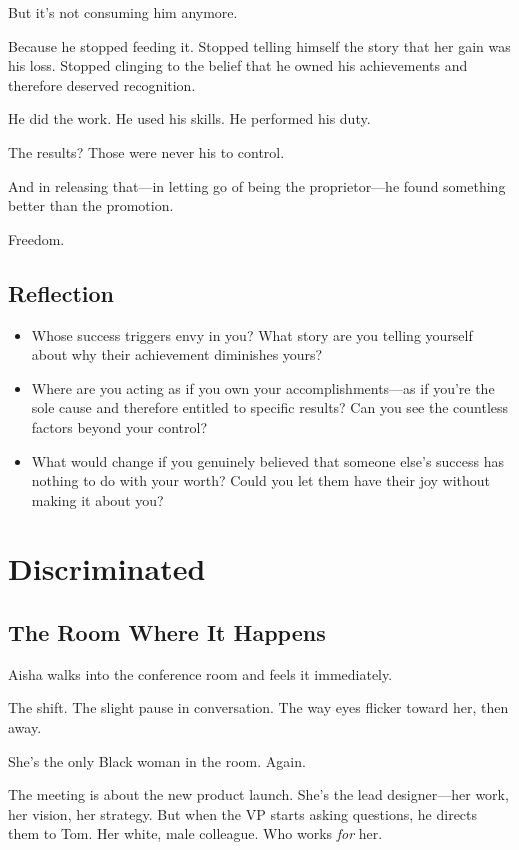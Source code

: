 \documentclass[11pt,twoside]{book}
\begin{document}
But it's not consuming him anymore.

Because he stopped feeding it. Stopped telling himself the story that her gain was his loss. Stopped clinging to the belief that he owned his achievements and therefore deserved recognition.

He did the work. He used his skills. He performed his duty.

The results? Those were never his to control.

And in releasing that—in letting go of being the proprietor—he found something better than the promotion.

Freedom.

\section*{Reflection}

\begin{itemize}
\item Whose success triggers envy in you? What story are you telling yourself about why their achievement diminishes yours?
\item Where are you acting as if you own your accomplishments—as if you're the sole cause and therefore entitled to specific results? Can you see the countless factors beyond your control?
\item What would change if you genuinely believed that someone else's success has nothing to do with your worth? Could you let them have their joy without making it about you?
\end{itemize}

\chapter{Discriminated}

\section*{The Room Where It Happens}

Aisha walks into the conference room and feels it immediately.

The shift. The slight pause in conversation. The way eyes flicker toward her, then away.

She's the only Black woman in the room. Again.

The meeting is about the new product launch. She's the lead designer—her work, her vision, her strategy. But when the VP starts asking questions, he directs them to Tom. Her white, male colleague. Who works \emph{for} her.
\end{document}
